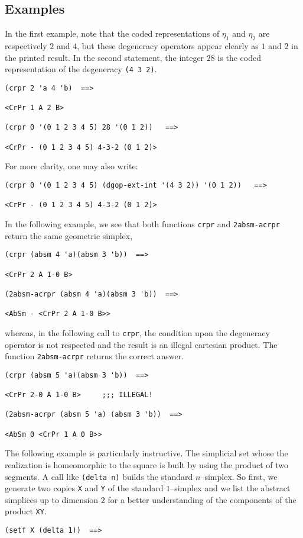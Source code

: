 {\subsection* {Examples}

In the first example, note that the coded representations of $\eta_1$ and $\eta_2$ are
respectively $2$ and $4$, but these degeneracy operators appear clearly as $1$ and $2$ in the printed result.
In the second statement, the integer $28$ is the coded representation of the degeneracy {\tt (4 3 2)}.
{\footnotesize\begin{verbatim}
(crpr 2 'a 4 'b)  ==>

<CrPr 1 A 2 B>

(crpr 0 '(0 1 2 3 4 5) 28 '(0 1 2))   ==>

<CrPr - (0 1 2 3 4 5) 4-3-2 (0 1 2)>
\end{verbatim}}
For more clarity, one may also write:
{\footnotesize\begin{verbatim}
(crpr 0 '(0 1 2 3 4 5) (dgop-ext-int '(4 3 2)) '(0 1 2))   ==>

<CrPr - (0 1 2 3 4 5) 4-3-2 (0 1 2)>
\end{verbatim}}
In the following example, we see that both functions {\tt crpr} and
{\tt 2absm-acrpr} return the same geometric simplex,
{\footnotesize\begin{verbatim}
(crpr (absm 4 'a)(absm 3 'b))  ==>

<CrPr 2 A 1-0 B>

(2absm-acrpr (absm 4 'a)(absm 3 'b))  ==>

<AbSm - <CrPr 2 A 1-0 B>>
\end{verbatim}}
whereas, in the following call to {\tt crpr}, the condition upon the degeneracy
operator is not respected and the result is an illegal cartesian product.
The function {\tt 2absm-acrpr} returns the correct answer.
{\footnotesize\begin{verbatim}
(crpr (absm 5 'a)(absm 3 'b))  ==>

<CrPr 2-0 A 1-0 B>     ;;; ILLEGAL!

(2absm-acrpr (absm 5 'a) (absm 3 'b))  ==>

<AbSm 0 <CrPr 1 A 0 B>>
\end{verbatim}}
The following example is particularly instructive. The simplicial set
whose the realization is homeomorphic to the  square is built by using the product of two segments.
A call like {\tt (delta n)} builds  the standard $n$--simplex. So first, we generate
two copies {\tt X} and {\tt Y} of the standard $1$--simplex and we list the abstract simplices
up to dimension $2$ for a better understanding of the components of the product {\tt XY}.
{\footnotesize\begin{verbatim}
(setf X (delta 1))  ==>


\end{verbatim}}}
